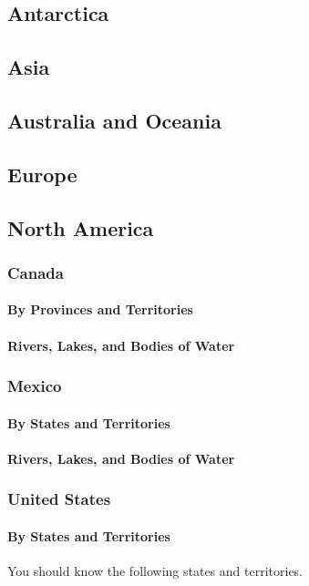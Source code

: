 	\subsection{Antarctica}
	\subsection{Asia}
	\subsection{Australia and Oceania}
	\subsection{Europe}
	\subsection{North America}
		\subsubsection{Canada}
			\paragraph{By Provinces and Territories}
			\paragraph{Rivers, Lakes, and Bodies of Water}
			
		\subsubsection{Mexico}
						\paragraph{By States and Territories}
						
			\paragraph{Rivers, Lakes, and Bodies of Water}
		\newpage
		\subsubsection{United States}
			\paragraph{By States and Territories} You should know the following states and territories. 
			


